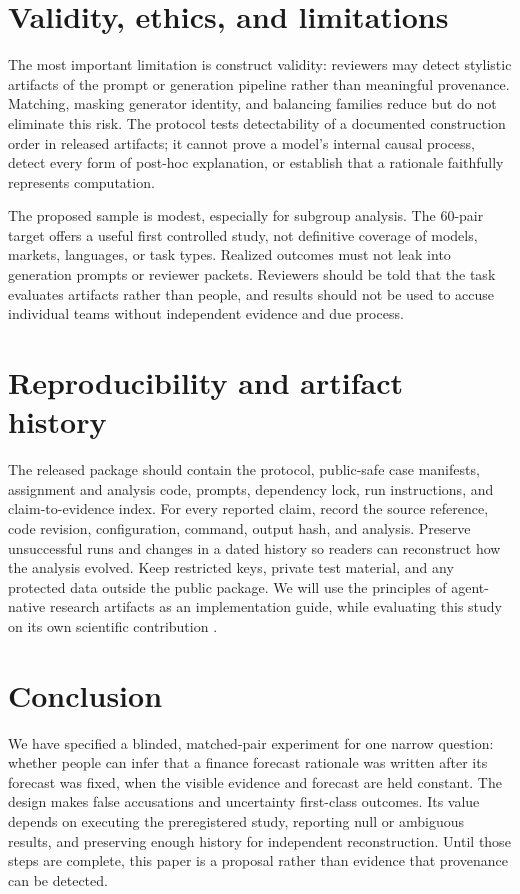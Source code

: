 \documentclass[10pt]{article}
\begin{document}
\section{Validity, ethics, and limitations}
The most important limitation is construct validity: reviewers may detect stylistic artifacts of the prompt or generation pipeline rather than meaningful provenance. Matching, masking generator identity, and balancing families reduce but do not eliminate this risk. The protocol tests detectability of a documented construction order in released artifacts; it cannot prove a model's internal causal process, detect every form of post-hoc explanation, or establish that a rationale faithfully represents computation.

The proposed sample is modest, especially for subgroup analysis. The 60-pair target offers a useful first controlled study, not definitive coverage of models, markets, languages, or task types. Realized outcomes must not leak into generation prompts or reviewer packets. Reviewers should be told that the task evaluates artifacts rather than people, and results should not be used to accuse individual teams without independent evidence and due process.

\section{Reproducibility and artifact history}
The released package should contain the protocol, public-safe case manifests, assignment and analysis code, prompts, dependency lock, run instructions, and claim-to-evidence index. For every reported claim, record the source reference, code revision, configuration, command, output hash, and analysis. Preserve unsuccessful runs and changes in a dated history so readers can reconstruct how the analysis evolved. Keep restricted keys, private test material, and any protected data outside the public package. We will use the principles of agent-native research artifacts as an implementation guide, while evaluating this study on its own scientific contribution \cite{liu2026ara}.

\section{Conclusion}
We have specified a blinded, matched-pair experiment for one narrow question: whether people can infer that a finance forecast rationale was written after its forecast was fixed, when the visible evidence and forecast are held constant. The design makes false accusations and uncertainty first-class outcomes. Its value depends on executing the preregistered study, reporting null or ambiguous results, and preserving enough history for independent reconstruction. Until those steps are complete, this paper is a proposal rather than evidence that provenance can be detected.
\end{document}
